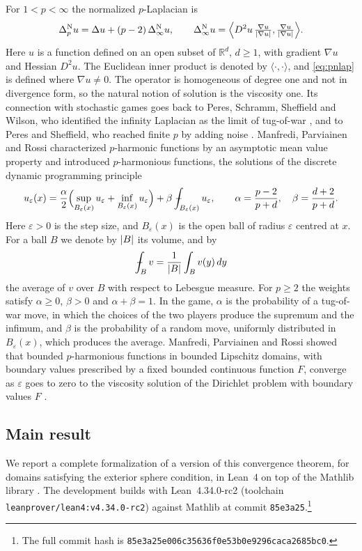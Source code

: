\documentclass[11pt,reqno]{amsart}
\newcommand{\R}{\mathbb{R}}
\newcommand{\eps}{\varepsilon}
\newcommand{\pnlap}{\Delta_p^{\mathrm{N}}}       %
\newcommand{\inflap}{\Delta_\infty^{\mathrm{N}}} %
\DeclarePairedDelimiter{\abs}{\lvert}{\rvert}
\theoremstyle{plain}
\theoremstyle{definition}
\theoremstyle{remark}
\begin{document}
For $1 < p < \infty$ the normalized $p$-Laplacian is
\begin{equation}\label{eq:pnlap}
  \pnlap u = \Delta u + (p-2)\,\inflap u, \qquad
  \inflap u = \Bigl\langle D^2u\,\tfrac{\nabla u}{\abs{\nabla u}},
                \tfrac{\nabla u}{\abs{\nabla u}}\Bigr\rangle .
\end{equation}
Here $u$ is a function defined on an open subset of $\R^d$, $d \ge 1$, with
gradient $\nabla u$ and Hessian $D^2u$. The Euclidean inner product is denoted
by $\langle\cdot,\cdot\rangle$, and \eqref{eq:pnlap} is defined where
$\nabla u \ne 0$.
The operator is homogeneous of degree one and not in divergence form, so the
natural notion of solution is the viscosity one. Its connection with
stochastic games goes back to Peres, Schramm, Sheffield and Wilson, who
identified the infinity Laplacian as the limit of tug-of-war \cite{PSSW09},
and to Peres and Sheffield, who reached finite $p$ by adding noise
\cite{PS08}. Manfredi, Parviainen and Rossi characterized $p$-harmonic
functions by an asymptotic mean value property \cite{MPR10} and introduced
$p$-harmonious functions, the solutions of the discrete dynamic programming
principle
\begin{equation}\label{eq:dpp}
  u_\eps(x) = \frac{\alpha}{2}\Bigl(\sup_{B_\eps(x)} u_\eps
     + \inf_{B_\eps(x)} u_\eps\Bigr)
     + \beta \fint_{B_\eps(x)} u_\eps, \qquad
  \alpha = \frac{p-2}{p+d}, \quad \beta = \frac{d+2}{p+d}.
\end{equation}
Here $\eps > 0$ is the step size, and $B_\eps(x)$ is the open ball of radius
$\eps$ centred at $x$. For a ball $B$ we denote by $\abs B$ its volume, and by
\[
  \fint_B v = \frac{1}{\abs B}\int_B v(y)\,dy
\]
the average of $v$ over $B$ with respect to Lebesgue measure. For $p \ge 2$
the weights satisfy $\alpha \ge 0$, $\beta > 0$ and $\alpha + \beta = 1$. In
the game, $\alpha$ is the probability of a tug-of-war move, in which the
choices of the two players produce the supremum and the infimum, and $\beta$
is the probability of a random move, uniformly distributed in $B_\eps(x)$,
which produces the average. Manfredi, Parviainen and Rossi showed that bounded
$p$-harmonious functions in bounded Lipschitz domains, with boundary values
prescribed by a fixed bounded continuous function $F$, converge as $\eps$ goes
to zero to the viscosity solution of the Dirichlet problem with boundary
values $F$ \cite{MPR12}.

\subsection*{Main result}
We report a complete formalization of a version of this convergence theorem,
for domains satisfying the exterior sphere condition, in Lean~4
\cite{dMU21} on top of the Mathlib library \cite{Mathlib20}.
The development builds with Lean~4.34.0-rc2 (toolchain
\texttt{leanprover/lean4:v4.34.0-rc2}) against Mathlib at commit
\texttt{85e3a25}.\footnote{The full commit hash is
\texttt{85e3a25e006c35636f0e53b0e9296caca2685bc0}.}
\end{document}
